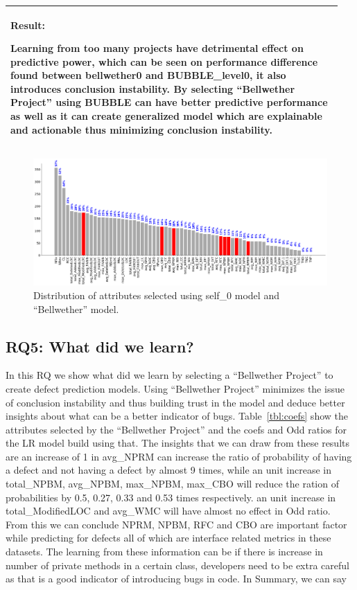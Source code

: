 \documentclass[10pt,journal,compsoc]{IEEEtran}
\newenvironment{result}
{\vspace{0.15cm}
\noindent\begin{minipage}{\linewidth}
\begin{center}
\arrayrulecolor{lightergray}
\begin{tabular}{|p{0.95\linewidth}|}
\hline%
\rowcolor{lightergray}%
\textbf{Result:}~%
}
{\\\hline
\end{tabular}
\end{center}
\end{minipage}
\vspace{0.15cm}
}
\begin{document}
\begin{result}
{Learning from too many projects have detrimental effect on predictive power, which can be seen on performance difference found between bellwether0 and BUBBLE\_level0, it also introduces conclusion instability. By selecting ``Bellwether Project'' using BUBBLE can have better predictive performance as well as it can create generalized model which are explainable and actionable thus minimizing conclusion instability.}
\end{result}

\begin{figure}[h]
    \centering
    \includegraphics[width=\linewidth]{figs/FSS_compare.png}
    \caption{Distribution of attributes selected using self\_0 model and ``Bellwether'' model.}
    \label{fig:FSS_compare}
\end{figure}

\subsection*{RQ5: What did we learn?}
\label{sec:rq5}

In this RQ we show what did we learn by selecting a ``Bellwether Project'' to create defect prediction models. Using ``Bellwether Project''  minimizes the issue of conclusion instability and thus building trust in the model and deduce better insights about what can be a better indicator of bugs. Table~\ref{tbl:coefs} show the attributes selected by the ``Bellwether Project'' and the coefs and Odd ratios for the LR model build using that. The insights that we can draw from these results are an increase of 1 in avg\_NPRM can increase the ratio of probability of having a defect and not having a defect by almost 9 times, while an unit increase in total\_NPBM, avg\_NPBM, max\_NPBM, max\_CBO will reduce the ration of probabilities by 0.5, 0.27, 0.33 and 0.53 times respectively. an unit increase in total\_ModifiedLOC and avg\_WMC will have almost no effect in Odd ratio. From this we can conclude NPRM, NPBM, RFC and CBO are important factor while predicting for defects all of which are interface related metrics in these datasets. The learning from these information can be if there is increase in number of private methods in a certain class, developers need to be extra careful as that is a good indicator of introducing bugs in code. In Summary, we can say 
\end{document}
